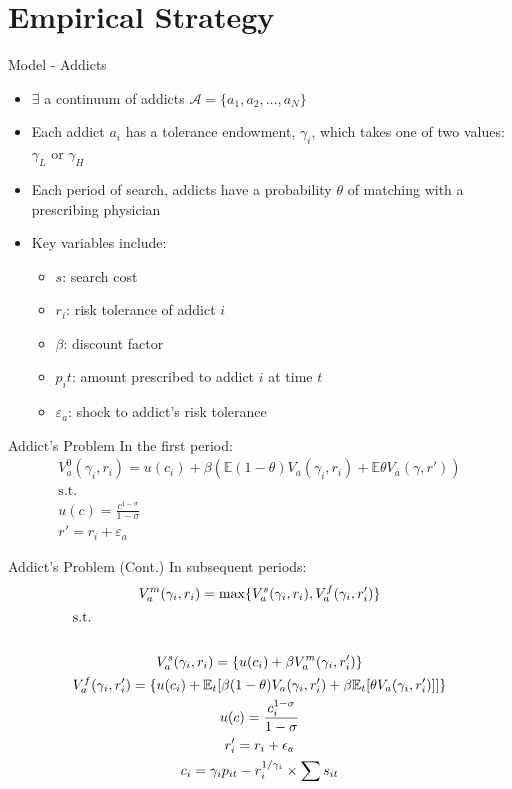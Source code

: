 \documentclass[aspectratio=169,professionalfonts]{beamer}
\begin{document}
\section{Empirical Strategy}

  \begin{frame}{Model - Addicts}
    \begin{itemize}
      \item $\exists$ a continuum of addicts $\mathcal{A} = \{a_1, a_2, \ldots, a_N\}$
      \item Each addict $a_i$ has a tolerance endowment, $\gamma_i$, which takes one of two values: $\gamma_L$ or $\gamma_H$
      \item Each period of search, addicts have a probability $\theta$ of matching with a prescribing physician
      \item Key variables include:
      \begin{itemize}
        \item $s$: search cost
        \item $r_i$: risk tolerance of addict $i$
        \item $\beta$: discount factor
        \item $p_it$: amount prescribed to addict $i$ at time $t$
        \item $\varepsilon_a$: shock to addict's risk tolerance
      \end{itemize}
    \end{itemize}
  \end{frame}

  \begin{frame}{Addict's Problem}
    In the first period:
    \begin{gather*}
      V_a^0(\gamma_i, r_i) = u(c_i) + \beta(\mathbb{E}(1-\theta)V_a(\gamma_i, r_i) + \mathbb{E}\theta V_a(\gamma, r')) \\
      \text{s.t. } \\
      u(c) = \frac{c^{1-\sigma}}{1-\sigma} \\
      r' = r_i + \varepsilon_a
    \end{gather*}
  \end{frame}
  \begin{frame}{Addict's Problem (Cont.)}
    In subsequent periods:
\begin{gather*}
  V_a^m(\gamma_i, r_i) = \max\{V_a^s(\gamma_i, r_i), V_a^f(\gamma_i, r_i')\} \\
  \shortintertext{s.t.} \\
  V_a^s(\gamma_i, r_i) = \{u(c_i) + \beta V_a^m(\gamma_i, r_i')\} \\
  V_a^f(\gamma_i, r_i') = \{u(c_i) + \mathbb{E}_{t}[\beta(1-\theta)V_a(\gamma_i, r_i') + \beta \mathbb{E}_{t}[\theta V_a(\gamma_i, r_i')]]\} \\
  u(c) = \frac{c_i^{1-\sigma}}{1-\sigma} \\
  r_i' = r_i + \epsilon_a \\
  c_i =\gamma_ip_{it} - r_i^{1/\gamma_i} \times \sum s_{it}
\end{gather*}
  \end{frame}
\end{document}
